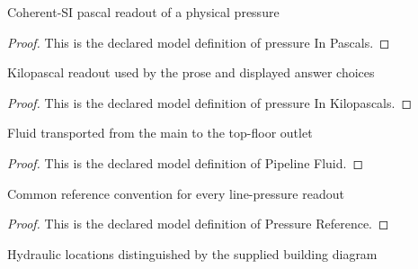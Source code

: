 \begin{definition}
  \label{def:physics:phyx-mini-0394:phyxminiproblems-problemphyxmini0394-pressureinpascals}
  Coherent-SI pascal readout of a physical pressure
\end{definition}
\begin{proof}
  This is the declared model definition of pressure In Pascals.
\end{proof}
\begin{definition}
  \label{def:physics:phyx-mini-0394:phyxminiproblems-problemphyxmini0394-pressureinkilopascals}
  Kilopascal readout used by the prose and displayed answer choices
\end{definition}
\begin{proof}
  This is the declared model definition of pressure In Kilopascals.
\end{proof}
\begin{definition}
  \label{def:physics:phyx-mini-0394:phyxminiproblems-problemphyxmini0394-pipelinefluid}
  Fluid transported from the main to the top-floor outlet
\end{definition}
\begin{proof}
  This is the declared model definition of Pipeline Fluid.
\end{proof}
\begin{definition}
  \label{def:physics:phyx-mini-0394:phyxminiproblems-problemphyxmini0394-pressurereference}
  Common reference convention for every line-pressure readout
\end{definition}
\begin{proof}
  This is the declared model definition of Pressure Reference.
\end{proof}
\begin{definition}
  \label{def:physics:phyx-mini-0394:phyxminiproblems-problemphyxmini0394-hydrauliclocation}
  Hydraulic locations distinguished by the supplied building diagram
\end{definition}
